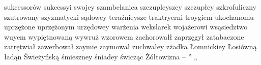 \begin{itemize}
sukcessorów sukcessyi swojey szambelanica szczupleyszey szczupłey szkrofuliczny szutrowany szyzmatycki sądowey teraźnieysze traktryerni troygiem ukochanomu uprzężone uprzężonym urzędowey warżenia wekslarek wojażerowi wsąsiedztwo wuyem wypiętnowaną wywruż wzorowem zachorowałł zaprzęgył zatabaczone zatrętwiał zawerbował zaymie zaymował zuchwałey zżadka Łomnickiey Łosiówną ładąn Świeżyńską śmieszney śniadey świcząc Żółtowizna – ” „
\end{itemize}

